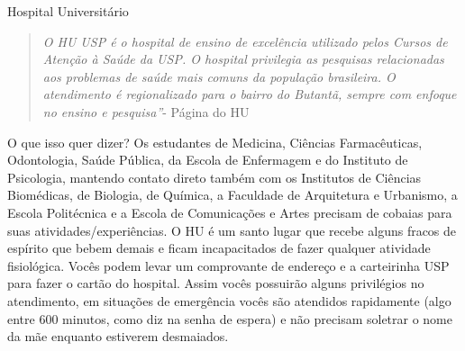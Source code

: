 \begin{secao}{Hospital Universitário}
   \begin{quote}\emph{O HU USP é o hospital de ensino de excelência utilizado
pelos Cursos de Atenção à Saúde da USP.  O hospital privilegia as pesquisas
relacionadas aos problemas de saúde  mais comuns da população brasileira. O
atendimento é regionalizado para o bairro do Butantã, sempre com enfoque no
ensino e pesquisa''}- Página do HU
   \end{quote}

O que isso quer dizer? Os estudantes de Medicina, Ciências Farmacêuticas,
Odontologia, Saúde Pública, da Escola de Enfermagem e do Instituto de
Psicologia, mantendo contato direto também com os Institutos de Ciências
Biomédicas, de Biologia, de Química, a Faculdade de Arquitetura e Urbanismo,
a Escola Politécnica e a Escola de Comunicações e Artes precisam de cobaias para
suas atividades/experiências. O HU é um santo lugar que recebe alguns fracos
de espírito que bebem demais e ficam incapacitados de fazer qualquer atividade
fisiológica. Vocês podem levar um comprovante de endereço e a
carteirinha USP para fazer o cartão do hospital. Assim vocês possuirão alguns
privilégios no atendimento, em situações de emergência vocês são atendidos
rapidamente (algo entre 600 minutos, como diz na senha de espera) e não
precisam soletrar o nome da mãe enquanto estiverem desmaiados.

\end{secao}
